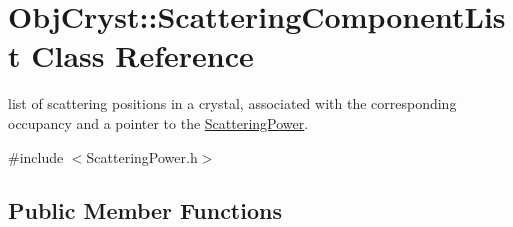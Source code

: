 \hypertarget{class_obj_cryst_1_1_scattering_component_list}{}\section{Obj\+Cryst\+::Scattering\+Component\+List Class Reference}
\label{class_obj_cryst_1_1_scattering_component_list}


list of scattering positions in a crystal, associated with the corresponding occupancy and a pointer to the \mbox{\hyperlink{class_obj_cryst_1_1_scattering_power}{Scattering\+Power}}.  




{\ttfamily \#include $<$Scattering\+Power.\+h$>$}

\subsection*{Public Member Functions}
